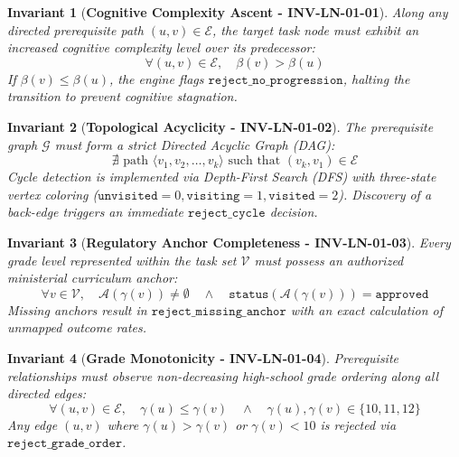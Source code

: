 \documentclass[11pt,a4paper]{article}
\newtheorem{invariant}{Invariant}
\begin{document}
\begin{invariant}[\textbf{Cognitive Complexity Ascent - INV-LN-01-01}]
Along any directed prerequisite path $(u, v) \in \mathcal{E}$, the target task node must exhibit an increased cognitive complexity level over its predecessor:
\begin{equation}
\forall (u, v) \in \mathcal{E}, \quad \beta(v) > \beta(u)
\end{equation}
If $\beta(v) \le \beta(u)$, the engine flags $\mathtt{reject\_no\_progression}$, halting the transition to prevent cognitive stagnation.
\end{invariant}

\begin{invariant}[\textbf{Topological Acyclicity - INV-LN-01-02}]
The prerequisite graph $\mathcal{G}$ must form a strict Directed Acyclic Graph (DAG):
\begin{equation}
\nexists \text{ path } \langle v_1, v_2, \dots, v_k \rangle \text{ such that } (v_k, v_1) \in \mathcal{E}
\end{equation}
Cycle detection is implemented via Depth-First Search (DFS) with three-state vertex coloring ($\mathtt{unvisited}=0, \mathtt{visiting}=1, \mathtt{visited}=2$). Discovery of a back-edge triggers an immediate $\mathtt{reject\_cycle}$ decision.
\end{invariant}

\begin{invariant}[\textbf{Regulatory Anchor Completeness - INV-LN-01-03}]
Every grade level represented within the task set $\mathcal{V}$ must possess an authorized ministerial curriculum anchor:
\begin{equation}
\forall v \in \mathcal{V}, \quad \mathcal{A}(\gamma(v)) \neq \emptyset \quad \land \quad \mathtt{status}(\mathcal{A}(\gamma(v))) = \mathtt{approved}
\end{equation}
Missing anchors result in $\mathtt{reject\_missing\_anchor}$ with an exact calculation of unmapped outcome rates.
\end{invariant}

\begin{invariant}[\textbf{Grade Monotonicity - INV-LN-01-04}]
Prerequisite relationships must observe non-decreasing high-school grade ordering along all directed edges:
\begin{equation}
\forall (u, v) \in \mathcal{E}, \quad \gamma(u) \le \gamma(v) \quad \land \quad \gamma(u), \gamma(v) \in \{10, 11, 12\}
\end{equation}
Any edge $(u, v)$ where $\gamma(u) > \gamma(v)$ or $\gamma(v) < 10$ is rejected via $\mathtt{reject\_grade\_order}$.
\end{invariant}
\end{document}
